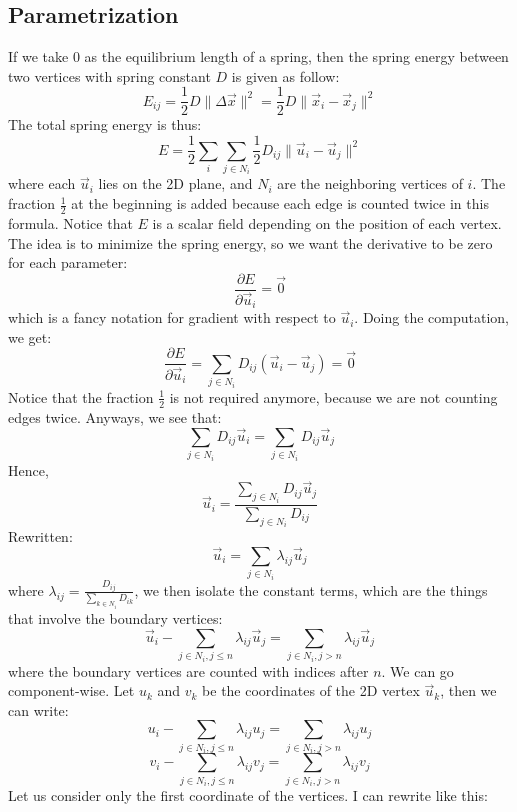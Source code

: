 \documentclass{article}
\begin{document}
\subsection{Parametrization}
If we take $0$ as the equilibrium length of a spring, then the spring energy between two vertices with spring constant $D$ is given as follow:
$$E_{ij} = \frac{1}{2} D \lVert \Delta \vec{x} \rVert ^2 = \frac{1}{2} D \lVert \vec{x}_i - \vec{x}_j \rVert ^2$$
The total spring energy is thus:
$$E = \frac{1}{2} \sum_{i} \sum_{j \in N_i} \frac{1}{2} D_{ij} \lVert \vec{u}_i - \vec{u}_j \rVert ^2$$
where each $\vec{u}_i$ lies on the 2D plane, and $N_i$ are the neighboring vertices of $i$. The fraction $\frac{1}{2}$ at the beginning is added because each edge is counted twice in this formula. Notice that $E$ is a scalar field depending on the position of each vertex. The idea is to minimize the spring energy, so we want the derivative to be zero for each parameter:
$$\frac{\partial E}{\partial \vec{u}_i} = \vec{0}$$
which is a fancy notation for gradient with respect to $\vec{u}_i$. Doing the computation, we get:
$$\frac{\partial E}{\partial \vec{u}_i} = \sum_{j \in N_i} D_{ij} (\vec{u}_i - \vec{u}_j) = \vec{0}$$
Notice that the fraction $\frac{1}{2}$ is not required anymore, because we are not counting edges twice. Anyways, we see that:
$$\sum_{j \in N_i} D_{ij} \vec{u}_i = \sum_{j \in N_i} D_{ij} \vec{u}_j$$
Hence,
$$\vec{u}_i = \frac{\sum_{j \in N_i} D_{ij} \vec{u}_j}{\sum_{j \in N_i} D_{ij}}$$
Rewritten:
$$\vec{u}_i = \sum_{j \in N_i} \lambda_{ij} \vec{u}_j$$
where $\lambda_{ij} = \frac{D_{ij}}{\sum_{k \in N_i} D_{ik}}$, we then isolate the constant terms, which are the things that involve the boundary vertices:
$$\vec{u}_i - \sum_{j \in N_i, j \leq n} \lambda_{ij} \vec{u}_j = \sum_{j \in N_i, j > n} \lambda_{ij} \vec{u}_j$$
where the boundary vertices are counted with indices after $n$. We can go component-wise. Let $u_k$ and $v_k$ be the coordinates of the 2D vertex $\vec{u}_k$, then we can write:
$$u_i - \sum_{j \in N_i, j \leq n} \lambda_{ij} u_j = \sum_{j \in N_i, j > n} \lambda_{ij} u_j$$
$$v_i - \sum_{j \in N_i, j \leq n} \lambda_{ij} v_j = \sum_{j \in N_i, j > n} \lambda_{ij} v_j$$
Let us consider only the first coordinate of the vertices. I can rewrite like this:
\end{document}
